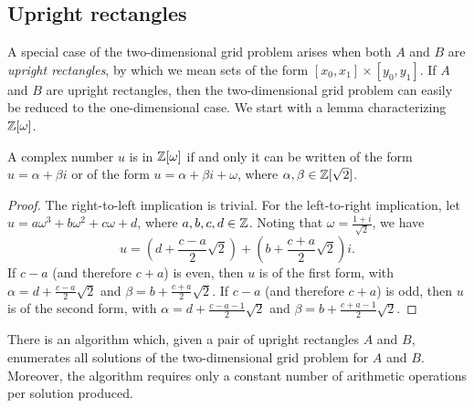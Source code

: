 \documentclass{article}
\begin{document}
\subsection{Upright rectangles}\label{subsec-upright-rectangles}

A special case of the two-dimensional grid problem arises when both
$A$ and $B$ are {\em upright rectangles}, by which we mean sets of the
form $[x_0,x_1]\times [y_0,y_1]$.  If $A$ and $B$ are upright
rectangles, then the two-dimensional grid problem can easily be
reduced to the one-dimensional case. We start with a lemma
characterizing $\mathbb{Z}[\omega]$.

\begin{lemma}\label{lem-zomega}
  A complex number $u$ is in $\mathbb{Z}[\omega]$ if and only it can be
  written of the form $u=\alpha+\beta i$ or of the form
  $u=\alpha+\beta i+\omega$, where $\alpha,\beta\in\mathbb{Z}[\sqrt 2]$.
\end{lemma}

\begin{proof}
  The right-to-left implication is trivial. For the left-to-right
  implication, let $u=a\omega^3+b\omega^2+c\omega+d$, where
  $a,b,c,d\in\mathbb{Z}$. Noting that $\omega=\frac{1+i}{\sqrt 2}$, we have
  \[ u = (d + \frac{c-a}{2} \sqrt2) + (b + \frac{c+a}{2}{\sqrt2})i.
  \]
  If $c-a$ (and therefore $c+a$) is even, then $u$ is of the first
  form, with $\alpha=d + \frac{c-a}{2} \sqrt2$ and $\beta=b +
  \frac{c+a}{2}{\sqrt2}$. If $c-a$ (and therefore $c+a$) is odd, then
  $u$ is of the second form, with $\alpha=d + \frac{c-a-1}{2} \sqrt2$
  and $\beta = b + \frac{c+a-1}{2}{\sqrt2}$. 
\end{proof}

\begin{lemma}\label{lem-upright-rectangles}
  There is an algorithm which, given a pair of upright rectangles $A$
  and $B$, enumerates all solutions of the two-dimensional grid
  problem for $A$ and $B$. Moreover, the algorithm requires only a
  constant number of arithmetic operations per solution produced.
\end{lemma}
\end{document}
